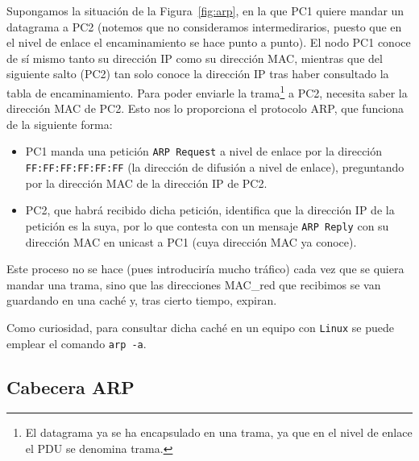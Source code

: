 Supongamos la situación de la Figura~\ref{fig:arp}, en la que PC1 quiere mandar un datagrama a PC2 (notemos que no consideramos intermedirarios, puesto que en el nivel de enlace el encaminamiento se hace punto a punto). El nodo PC1 conoce de sí mismo tanto su dirección IP como su dirección MAC\@, mientras que del siguiente salto (PC2) tan solo conoce la dirección IP tras haber consultado la tabla de encaminamiento. Para poder enviarle la trama\footnote{El datagrama ya se ha encapsulado en una trama, ya que en el nivel de enlace el \acrshort{PDU} se denomina trama.} a PC2, necesita saber la dirección MAC de PC2\@. Esto nos lo proporciona el protocolo \acrshort{ARP}, que funciona de la siguiente forma:
\begin{itemize}
    \item PC1 manda una petición \verb|ARP Request| a nivel de enlace por la dirección \verb|FF:FF:FF:FF:FF:FF| (la dirección de difusión a nivel de enlace), preguntando por la dirección MAC de la dirección IP de PC2.
    
    \item PC2, que habrá recibido dicha petición, identifica que la dirección IP de la petición es la suya, por lo que contesta con un mensaje \verb|ARP Reply| con su dirección MAC en unicast a PC1 (cuya dirección MAC ya conoce).
\end{itemize}

Este proceso no se hace (pues introduciría mucho tráfico) cada vez que se quiera mandar una trama, sino que las direcciones \acrshort{MAC_red} que recibimos se van guardando en una caché y, tras cierto tiempo, expiran.
\begin{observacion}
    Como curiosidad, para consultar dicha caché en un equipo con \verb|Linux| se puede emplear el comando \verb|arp -a|.
\end{observacion}

\subsection{Cabecera \acrshort{ARP}}

